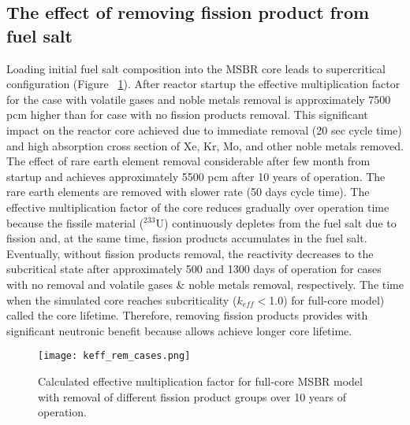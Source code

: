 \subsection{The effect of removing fission product from fuel salt}
Loading initial fuel salt composition into the \gls{MSBR} core leads to supercritical configuration (Figure ~\ref{fig:fp_removal}). After reactor startup the effective multiplication factor for the case with volatile gases and noble metals removal is approximately 7500 pcm  higher than for case with no fission products removal. This significant impact on the reactor core achieved due to immediate removal (20 sec cycle time) and high absorption cross section of Xe, Kr, Mo, and other noble metals removed. The effect of rare earth element removal considerable after few month from startup and achieves approximately 5500 pcm after 10 years of operation. The rare earth elements are removed with slower rate (50 days cycle time). The effective multiplication factor of the core reduces gradually over operation time because the fissile material ($^{233}$U) continuously depletes from the fuel salt due to fission and, at the same time, fission products accumulates in the fuel salt.	Eventually, without fission products removal, the reactivity decreases to the subcritical state after approximately 500 and 1300 days of operation for cases with no removal and volatile gases \& noble metals removal, respectively. The time when the simulated core reaches subcriticality ($k_{eff}<$1.0) for full-core model) called the core lifetime. Therefore, removing fission products provides with significant neutronic benefit because allows achieve longer core lifetime.
\begin{figure}[ht!] %
  \centering
  \texttt{[image: keff\_rem\_cases.png]} 
  \caption{Calculated effective multiplication factor for full-core \gls{MSBR} model with removal of different fission product groups over 10 years of operation.}
  \label{fig:fp_removal}
\end{figure}